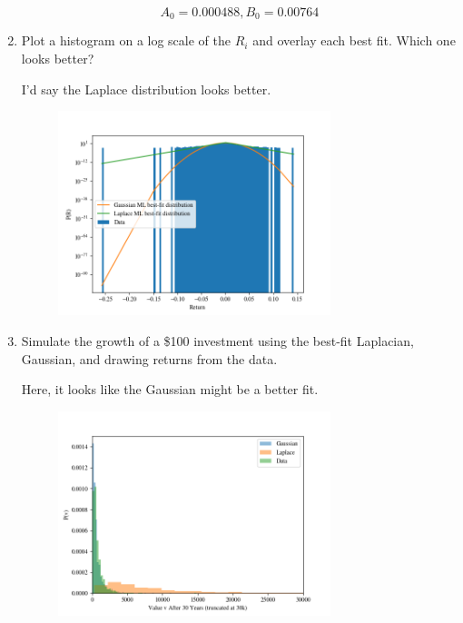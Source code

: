 \begin{enumerate}[label=\textbf{\Alph*}.]
    $$A_0=0.000488, B_0=0.00764$$

    \item Plot a histogram on a log scale of the $R_i$ and overlay each best fit. Which one looks better?

    I'd say the Laplace distribution looks better.
    \begin{figure}[H]
        \begin{center}
            \includegraphics[width=0.75\textwidth]{q1_return_hist.png}
        \end{center}
    \end{figure}

    \item Simulate the growth of a \$100 investment using the best-fit Laplacian, Gaussian, and drawing returns from the data.

    Here, it looks like the Gaussian might be a better fit.
    \begin{figure}[H]
        \begin{center}
            \includegraphics[width=0.75\textwidth]{q1_generator_comparison.png}
        \end{center}
    \end{figure}


\end{enumerate}
